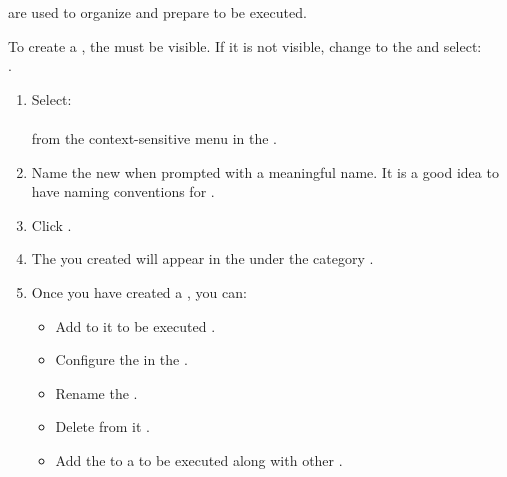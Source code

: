 
\gdsuites{} are used to organize and prepare \gdcases{} to be executed. 

To create a \gdsuite{}, the \gdtestsuitebrowser{} must be visible.
 If it is not visible, change to the \specpersp{} and select:\\
.

\begin{enumerate}
\item Select:\\
\\
from the context-sensitive menu in the \gdtestsuitebrowser{}. 

 \item Name  the new \gdsuite{} when prompted with a meaningful name. It is a good idea to have naming conventions for \gdsuites{}. 
\item Click . 
\item The \gdsuite{} you created will appear in the \gdtestsuitebrowser{} under the category \bxname{\gdsuites{}}. 
\item Once you have created a \gdsuite{}, you can:
\begin{itemize}
\item Add \gdcases{} to it to be executed .
\item Configure the \gdsuite{} in the \gdpropview{} .
\item Rename the \gdsuite{} .
\item Delete \gdcases{} from it .
\item Add the \gdsuite{} to a \gdjob{} to be executed along with other \gdsuites{} .
\end{itemize}
\end{enumerate}



